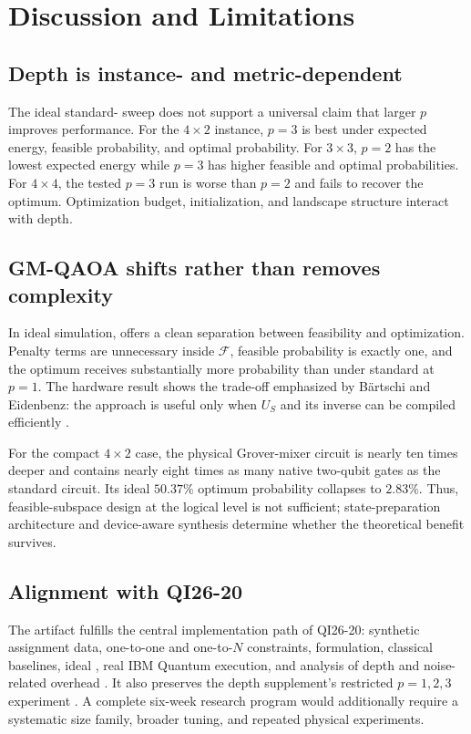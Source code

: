 \section{Discussion and Limitations}

\subsection{Depth is instance- and metric-dependent}

The ideal standard-\QAOA{} sweep does not support a universal claim that larger $p$ improves performance. For the $4\times2$ instance, $p=3$ is best under expected energy, feasible probability, and optimal probability. For $3\times3$, $p=2$ has the lowest expected energy while $p=3$ has higher feasible and optimal probabilities. For $4\times4$, the tested $p=3$ run is worse than $p=2$ and fails to recover the optimum. Optimization budget, initialization, and landscape structure interact with depth.

\subsection{GM-QAOA shifts rather than removes complexity}

In ideal simulation, \GMQAOA{} offers a clean separation between feasibility and optimization. Penalty terms are unnecessary inside $\mathcal F$, feasible probability is exactly one, and the optimum receives substantially more probability than under standard \QAOA{} at $p=1$. The hardware result shows the trade-off emphasized by Bärtschi and Eidenbenz: the approach is useful only when $U_S$ and its inverse can be compiled efficiently \cite{baertschi2020}.

For the compact $4\times2$ case, the physical Grover-mixer circuit is nearly ten times deeper and contains nearly eight times as many native two-qubit gates as the standard circuit. Its ideal $50.37\%$ optimum probability collapses to $2.83\%$. Thus, feasible-subspace design at the logical level is not sufficient; state-preparation architecture and device-aware synthesis determine whether the theoretical benefit survives.

\subsection{Alignment with QI26-20}

The artifact fulfills the central implementation path of QI26-20: synthetic assignment data, one-to-one and one-to-$N$ constraints, \QUBO{} formulation, classical baselines, ideal \QAOA{}, real IBM Quantum execution, and analysis of depth and noise-related overhead \cite{qi2620}. It also preserves the depth supplement's restricted $p=1,2,3$ experiment \cite{depthsupplement}. A complete six-week research program would additionally require a systematic size family, broader tuning, and repeated physical experiments.

